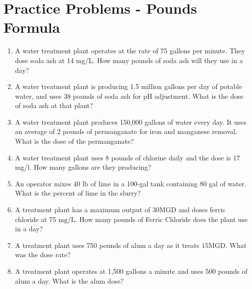 \section*{Practice Problems - Pounds Formula}
\begin{enumerate}

\item A water treatment plant operates at the rate of 75 gallons per minute. They dose soda ash at 14 mg/L. How many pounds of soda ash will they use in a day?

\item A water treatment plant is producing 1.5 million gallons per day of potable water, and
uses 38 pounds of soda ash for pH adjustment. What is the dose of soda ash at that plant?

\item A water treatment plant produces 150,000 gallons of water every day. It uses an
average of 2 pounds of permanganate for iron and manganese removal. What is the dose of the
permanganate? 

\item A water treatment plant uses 8 pounds of chlorine daily and the dose is 17 mg/l. How
many gallons are they producing?

\item An operator mixes 40 lb of lime in a 100-gal tank containing 80 gal of water. What is the percent of lime in the slurry?

\item A treatment plant has a maximum output of $30 \mathrm{MGD}$ and doses ferric chloride at 75 $\mathrm{mg} / \mathrm{L}$. How many pounds of Ferric Chloride does the plant use in a day?\\

\item  A treatment plant uses 750 pounds of alum a day as it treats $15 \mathrm{MGD}$. What was the dose rate?\\


\item  A treatment plant operates at 1,500 gallons a minute and uses 500 pounds of alum a day. What is the alum dose?\\

\end{enumerate}

